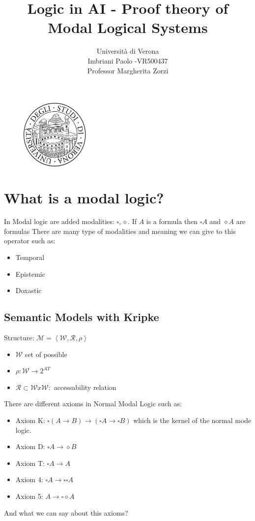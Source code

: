 \documentclass[a4paper]{article}
\title{Logic in AI - Proof theory of Modal Logical Systems}
\author{Università di Verona\\Imbriani Paolo -VR500437\\Professor Margherita Zorzi}
\begin{document}
\begin{figure}
    \centering
    \includegraphics[width=0.3\textwidth]{UniversityofVerona.png}
\end{figure}

\maketitle 

\pagebreak

\tableofcontents

\pagebreak

\section{What is a modal logic?}

In Modal logic are added modalities: $\square, \diamond.$ If $A$ is a formula then $\square A$ and $\diamond A$ are formulas
There are many type of modalities and meaning we can give to this operator such as:

\begin{itemize}
    \item Temporal 
    \item Epistemic
    \item Doxastic
\end{itemize}

\subsection{Semantic Models with Kripke}

Structure: $\mathcal{M} = \left<\mathcal{W}, \mathcal{R}, \rho\right>$
\begin{itemize}
    \item $\mathcal{W}$ set of possible
    \item $\rho : \mathcal{W} \rightarrow 2^{AT}$
    \item $\mathcal{R} \subset \mathcal{W} x \mathcal{W}:$ accessability relation
\end{itemize}
There are different axioms in Normal Modal Logic such as:
\begin{itemize}
    \item Axiom K: $\square(A \rightarrow B) \rightarrow (\square A \rightarrow \square B)$ which is the kernel
    of the normal mode logic.
    \item Axiom D: $\square A \rightarrow \diamond B$
    \item Axiom T: $\square A \rightarrow A$
    \item Axiom 4: $\square A \rightarrow \square \square A$
    \item Axiom 5: $A \rightarrow \square \diamond A$
\end{itemize}
And what we can say about this axioms?
\end{document}
